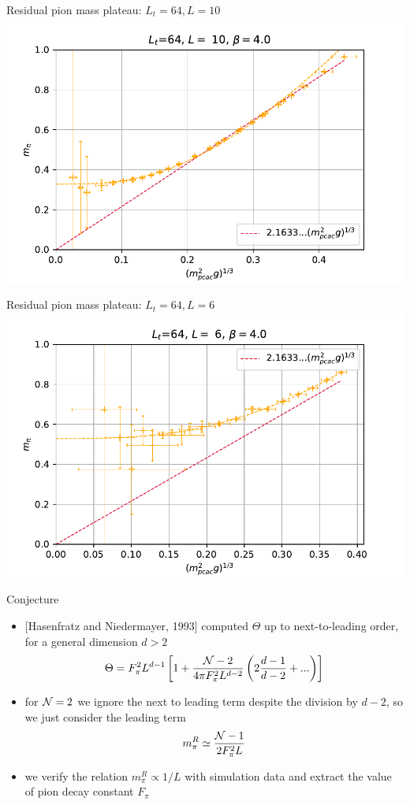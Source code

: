 \documentclass[english]{beamer}
\begin{document}
\begin{frame}{Residual pion mass plateau: $L_t = 64, L = 10$}
  \includegraphics[width=1\textwidth]{figs/Mpi10x64}
\end{frame}

\begin{frame}{Residual pion mass plateau: $L_t = 64, L = 6$}
  \includegraphics[width=1\textwidth]{figs/Mpi6x64Pt10}
\end{frame}

\begin{frame}{Conjecture}
  \begin{itemize}
    \item {[Hasenfratz and Niedermayer, 1993]} computed $\Theta$
      up to next-to-leading order, for a general dimension $d > 2$
            \[
        \Theta = F_\pi^2 L^{d-1} \left[1 +
          \frac{{\cal N} - 2}{4\pi F_\pi^2 L^{d-2}}
          \left(2\frac{d - 1}{d - 2} + ...\right) \right]
      \]
    \item for ${\cal N} = 2$ we ignore the next to leading term despite
      the division by $d - 2$,
      so we just consider the leading term
      \[
        m_\pi^R \simeq \frac{{\cal N} - 1}{2F_\pi^2 L}
      \]
    \item we verify the relation $m_\pi^R \propto 1 / L$ with
      simulation data and extract the value of pion decay
      constant $F_\pi$
  \end{itemize}
\end{frame}
\end{document}

